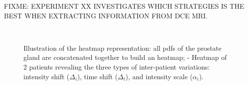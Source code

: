 \documentclass[a4paper,num-refs]{wiley-article}
\begin{document}
FIXME: EXPERIMENT XX INVESTIGATES WHICH STRATEGIES IS THE BEST WHEN EXTRACTING
INFORMATION FROM DCE MRI.

\begin{figure}
  \centering
  \hspace*{\fill}
   \hfill
  \hspace*{\fill}
  \\
  \hspace*{\fill}
   \hfill
   \hfill
  \hspace*{\fill}
  \caption{\protect{} Illustration of the heatmap
    representation: all \ac*{pdf}s of the prostate gland are concatenated
    together to build an heatmap;
    \protect{}-\protect{} Heatmap of 2
    patients revealing the three types of inter-patient variations: intensity
    shift ($\Delta_i$), time shift ($\Delta_t$), and intensity scale
    ($\alpha_i$).}
  \label{fig:heatmap}
\end{figure}
\end{document}
